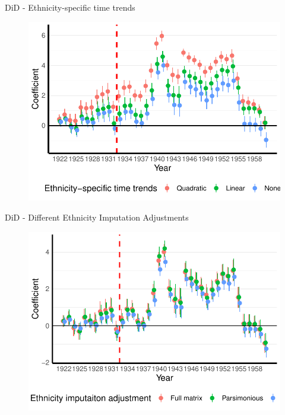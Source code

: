 \documentclass[11pt]{beamer}
\begin{document}
\begin{frame}[label=did_time_trends]{DiD - Ethnicity-specific time trends}
 \begin{figure}[h]
\centering
\includegraphics[width=1\textwidth]{trends_comp_pred_full_imp_date_cr2.pdf}
\end{figure}
\hyperlink{robustness_checks}{}
\end{frame}

\begin{frame}[label=did_pred_adj]{DiD - Different Ethnicity Imputation Adjustments}
 \begin{figure}[h]
\centering
\includegraphics[width=1\textwidth]{pred_adj_comp_pred_full_imp_date_cr2.pdf}
\end{figure}
\hyperlink{robustness_checks}{}
\end{frame}
\end{document}
